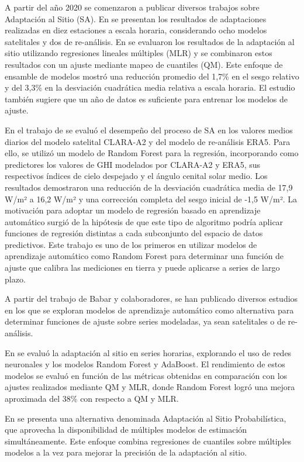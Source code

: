 A partir del año 2020 se comenzaron a publicar diversos trabajos sobre Adaptación al Sitio (SA). En \citep{POLO2020} se presentan los resultados de adaptaciones realizadas en diez estaciones a escala horaria, considerando ocho modelos satelitales y dos de re-análisis. En \citep{Fernández2020} se evaluaron los resultados de la adaptación al sitio utilizando regresiones lineales múltiples (MLR) y se combinaron estos resultados con un ajuste mediante mapeo de cuantiles (QM). Este enfoque de ensamble de modelos mostró una reducción promedio del 1,7\% en el sesgo relativo y del 3,3\% en la desviación cuadrática media relativa a escala horaria. El estudio también sugiere que un año de datos es suficiente para entrenar los modelos de ajuste.

En el trabajo de \citep{BABAR2020} se evaluó el desempeño del proceso de SA en los valores medios diarios del modelo satelital CLARA-A2 y del modelo de re-análisis ERA5. Para ello, se utilizó un modelo de Random Forest para la regresión, incorporando como predictores los valores de GHI modelados por CLARA-A2 y ERA5, sus respectivos índices de cielo despejado y el ángulo cenital solar medio. Los resultados demostraron una reducción de la desviación cuadrática media de 17,9 W/m² a 16,2 W/m² y una corrección completa del sesgo inicial de -1,5 W/m². La motivación para adoptar un modelo de regresión basado en aprendizaje automático surgió de la hipótesis de que este tipo de algoritmo podría aplicar funciones de regresión distintas a cada subconjunto del espacio de datos predictivos. Este trabajo es uno de los primeros en utilizar modelos de aprendizaje automático como Random Forest para determinar una función de ajuste que calibra las mediciones en tierra y puede aplicarse a series de largo plazo.

A partir del trabajo de Babar y colaboradores, se han publicado diversos estudios en los que se exploran modelos de aprendizaje automático como alternativa para determinar funciones de ajuste sobre series modeladas, ya sean satelitales o de re-análisis.

En \citep{NARVAEZ2021} se evaluó la adaptación al sitio en series horarias, explorando el uso de redes neuronales y los modelos Random Forest y AdaBoost. El rendimiento de estos modelos se evaluó en función de las métricas obtenidas en comparación con los ajustes realizados mediante QM y MLR, donde Random Forest logró una mejora aproximada del 38\% con respecto a QM y MLR.

En \citep{YANG2021} se presenta una alternativa denominada Adaptación al Sitio Probabilística, que aprovecha la disponibilidad de múltiples modelos de estimación simultáneamente. Este enfoque combina regresiones de cuantiles sobre múltiples modelos a la vez para mejorar la precisión de la adaptación al sitio.


